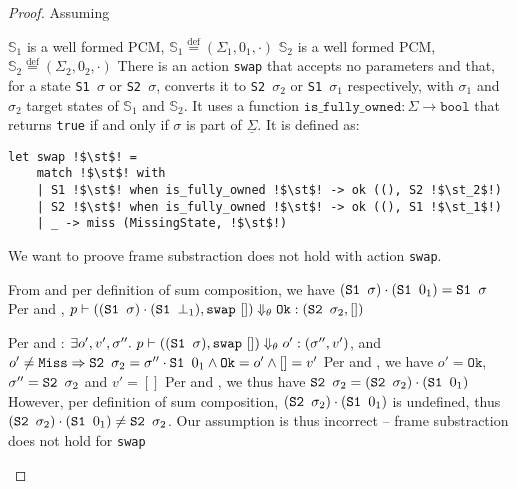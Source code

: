 \documentclass[,a4paper,oneside]{article}
\newcommand{\code}[1]{\texttt{#1}}
\newcommand{\defeq}[0]{\stackrel{\text{def}}=}
\newcommand{\mmdl}[0]{\ensuremath{\mathbb S}}
\newcommand{\rarr}[0]{\ensuremath{\rightarrow}}
\newcommand{\st}[0]{\sigma}
\newcommand{\evalsto}[3]{\ensuremath{p\vdash(#1)\Downarrow_\theta#2:(#3)}}
\newcommand{\Ok}[0]{\code{Ok}}
\newcommand{\Miss}[0]{\code{Miss}}
\begin{document}
\begin{proof}


Assuming 
\begin{hypvlist}
 $\mmdl_1$ is a well formed PCM, $\mmdl_1 \defeq (\Sigma_1, 0_1, \cdot)$
 $\mmdl_2$ is a well formed PCM, $\mmdl_2 \defeq (\Sigma_2, 0_2, \cdot)$
 There is an action \code{swap} that accepts no parameters and that, for a state \code{S1 $\st$} or \code{S2 $\st$}, converts it to \code{S2 $\st_2$} or \code{S1 $\st_1$} respectively, with $\st_1$ and $\st_2$ target states of $\mmdl_1$ and $\mmdl_2$. It uses a function ${\code{is\_fully\_owned} : \Sigma\rarr \code{bool}}$ that returns \code{true} if and only if $\st$ is part of $\underline\Sigma$. It is defined as: 

\begin{verbatim}
let swap !$\st$! =
	match !$\st$! with
	| S1 !$\st$! when is_fully_owned !$\st$! -> ok ((), S2 !$\st_2$!)
	| S2 !$\st$! when is_fully_owned !$\st$! -> ok ((), S1 !$\st_1$!)
	| _ -> miss (MissingState, !$\st$!)
\end{verbatim}
\end{hypvlist}
	
We want to proove frame substraction does not hold with action \code{swap}.
\begin{description}
	 From  and per definition of sum composition, we have $(\sone\st) \cdot (\sone0_1) = \sone\st$
	 Per  and , $\evalsto{(\sone\st) \cdot (\sone\bot_1), \code{swap}~[]}{\Ok}{\stwo\st_2, []}$
	\item Per  and :
		$\exists o',v',\st''.~\evalsto{(\sone\st),\code{swap}~[]}{o'}{\st'',v'}$, and
		$o'\neq\Miss\Rightarrow \stwo\st_2=\st''\cdot\sone0_1\land \Ok=o'\land []=v'$
	 Per  and , we have $o'=\Ok$, $\st''=\stwo{\st_2}$ and $v'=[]$
	 Per  and , we thus have $\stwo\st_2 = (\stwo\st_2)\cdot(\sone0_1)$
	 However, per definition of sum composition, $(\stwo\st_2)\cdot(\sone0_1)$ is undefined, thus $(\stwo\st_2)\cdot(\sone0_1) \neq \stwo\st_2$. Our assumption  is thus incorrect -- frame substraction does not hold for \code{swap}
\end{description}
\end{proof}
\end{document}
